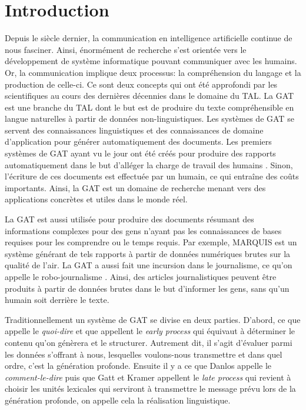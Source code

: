 
\chapter*{Introduction}


Depuis le siècle dernier, la communication en intelligence artificielle continue de nous fasciner. Ainsi, énormément de recherche s'est orientée vers le développement de système informatique pouvant communiquer avec les humains. Or, la communication implique deux processus: la compréhension du langage et la production de celle-ci. Ce sont deux concepts qui ont été approfondi par les scientifiques au cours des dernières décennies dans le domaine du \ac{TAL}. La \ac{GAT} est une branche du \ac{TAL} dont le but est de produire du texte compréhensible en langue naturelles à partir de données non-linguistiques. Les systèmes de \ac{GAT} se servent des connaissances linguistiques et des connaissances de domaine d'application pour générer automatiquement des documents.  Les premiers systèmes de \ac{GAT} ayant vu le jour ont été créés pour produire des rapports automatiquement dans le but d'alléger la charge de travail des humains \citep{ReiterBuildingNaturalLanguage2000}. Sinon, l'écriture de ces documents est effectuée par un humain, ce qui entraîne des coûts importants. Ainsi, la \ac{GAT} est un domaine de recherche menant vers des applications concrètes et utiles dans le monde réel.

La \ac{GAT} est aussi utilisée pour produire des documents résumant des informations complexes pour des gens n'ayant pas les connaissances de bases requises pour les comprendre ou le temps requis. Par exemple, MARQUIS \citep{WannerMARQUISGENERATIONUSERTAILORED2010} est un système générant de tels rapports à partir de données numériques brutes sur la qualité de l'air. La \ac{GAT} a aussi fait une incursion dans le journalisme, ce qu'on appelle le robo-journalisme \citep{W17-3513}. Ainsi, des articles journalistiques peuvent être produits à partir de données brutes dans le but d'informer les gens, sans qu'un humain soit derrière le texte.

Traditionnellement un système de \ac{GAT} se divise en deux parties. D'abord, ce que \cite{DanlosPresentationmodelegeneration1983} appelle le \emph{quoi-dire} et que \cite{gatt18} appellent le \emph{early process} qui équivaut à déterminer le contenu qu'on génèrera et le structurer. Autrement dit, il s'agit d'évaluer parmi les données s'offrant à nous, lesquelles voulons-nous transmettre et dans quel ordre, c'est la génération profonde. Ensuite il y a ce que Danlos appelle le \emph{comment-le-dire} puis que Gatt et Kramer appellent le \emph{late process} qui revient à choisir les unités lexicales qui serviront à transmettre le message prévu lors de la génération profonde, on appelle cela la réalisation linguistique.


